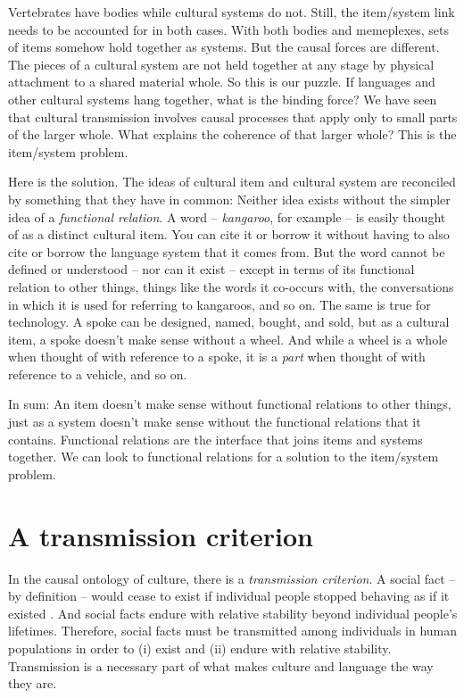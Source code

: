 Vertebrates have bodies while cultural systems 
do not. Still, the item/system link needs to be accounted for in both cases. With both bodies and memeplexes, sets of items somehow hold together as systems. But the causal forces are different. The pieces of a cultural system are not held together at any stage by physical 
attachment to a shared material whole. So this is our puzzle. If 
languages and other cultural systems hang together, what is the 
binding force? We have seen that cultural transmission involves causal processes that 
apply only to small parts of the larger whole. What explains the 
coherence of that larger whole? This is the item/system problem.



Here is the solution. The ideas of cultural item and cultural system are reconciled by something that they have in 
common: Neither idea exists without the simpler idea of a \textit{functional relation}. A word -- \textit{kangaroo}, for example -- is easily thought of as a 
distinct cultural item. You can cite it or borrow it without having to 
also cite or borrow the language system that it comes from. But the word 
cannot be defined or understood -- nor can it exist -- except in terms of its 
functional relation to other things, things like the words it co-occurs 
with, the conversations in which it is used for referring to kangaroos, 
and so on. The same is true for technology. A spoke can be designed, named, bought, and sold, 
but as a cultural item, a spoke doesn't make sense without a wheel. And 
while a wheel is a whole when thought of with reference to a spoke, it 
is a \textit{part} when thought of with reference to a vehicle, and so 
on. 



In sum: An item doesn't make sense without functional relations to other 
things, just as a system doesn't make sense without the functional 
relations that it contains. Functional relations are the interface that 
joins items and systems together. We can look to functional relations for a solution 
to the item/system problem.

\section{A transmission criterion}

In the causal ontology of culture, there is a \textit{transmission 
criterion}. A social fact -- by definition -- would cease to exist if 
individual people stopped behaving as if it existed \citep{searle_making_2010}. And social facts 
endure with relative stability beyond individual people's lifetimes. Therefore, social facts must be transmitted among individuals in human 
populations in order to (i) exist and (ii) endure with relative 
stability. Transmission is a necessary part of what makes culture and 
language the way they are. 



